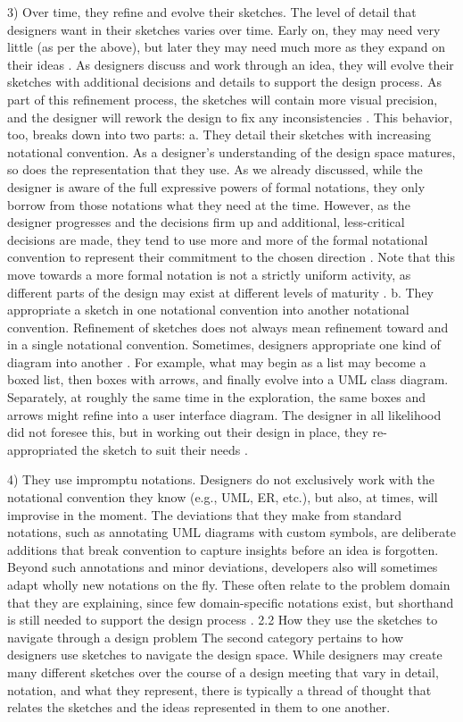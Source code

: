 3)	Over time, they refine and evolve their sketches. The level of detail that designers want in their sketches varies over time. Early on, they may need very little (as per the above), but later they may need much more as they expand on their ideas \citep{ossher12flexible}. As designers discuss and work through an idea, they will evolve their sketches with additional decisions and details to support the design process. As part of this refinement process, the sketches will contain more visual precision, and the designer will rework the design to fix any inconsistencies \citep{damm2000supporting}. This behavior, too, breaks down into two parts:
a.	They detail their sketches with increasing notational convention. As a designer’s understanding of the design space matures, so does the representation that they use. As we already discussed, while the designer is aware of the full expressive powers of formal notations, they only borrow from those notations what they need at the time. However, as the designer progresses and the decisions firm up and additional, less-critical decisions are made, they tend to use more and more of the formal notational convention to represent their commitment to the chosen direction \citep{ossher2010flexible}. Note that this move towards a more formal notation is not a strictly uniform activity, as different parts of the design may exist at different levels of maturity \citep{petre2009insights}.
b.	They appropriate a sketch in one notational convention into another notational convention. Refinement of sketches does not always mean refinement toward and in a single notational convention. Sometimes, designers appropriate one kind of diagram into another \citep{dekel2007notation}. For example, what may begin as a list may become a boxed list, then boxes with arrows, and finally evolve into a UML class diagram. Separately, at roughly the same time in the exploration, the same boxes and arrows might refine into a user interface diagram. The designer in all likelihood did not foresee this, but in working out their design in place, they re-appropriated the sketch to suit their needs \citep{mangano2012design}. 

4)	They use impromptu notations. Designers do not exclusively work with the notational convention they know (e.g., UML, ER, etc.), but also, at times, will improvise in the moment. The deviations that they make from standard notations, such as annotating UML diagrams with custom symbols, are deliberate additions that break convention to capture insights before an idea is forgotten. Beyond such annotations and minor deviations, developers also will sometimes adapt wholly new notations on the fly. These often relate to the problem domain that they are explaining, since few domain-specific notations exist, but shorthand is still needed to support the design process \cite{dekel2007notation}. 
2.2	How they use the sketches to navigate through a design problem
The second category pertains to how designers use sketches to navigate the design space. While designers may create many different sketches over the course of a design meeting that vary in detail, notation, and what they represent, there is typically a thread of thought that relates the sketches and the ideas represented in them to one another. 


